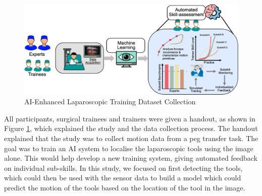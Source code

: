 


\begin{figure}
    \centering
    \includegraphics[width=1\linewidth]{dataset_collection.png}
    \caption{AI-Enhanced Laparoscopic Training Dataset Collection}
    \label{fig:dataset-collection}
\end{figure}

All participants, surgical trainees and trainers were given a handout, as shown in Figure \ref{fig:dataset-collection}, which explained the study and the data collection process. The handout explained that the study was to collect motion data from a peg transfer task. The goal was to train an AI system to localise the laparoscopic tools using the image alone. This would help develop a new training system, giving automated feedback on individual sub-skills. In this study, we focused on first detecting the tools, which could then be used with the sensor data to build a model which could predict the motion of the tools based on the location of the tool in the image.


